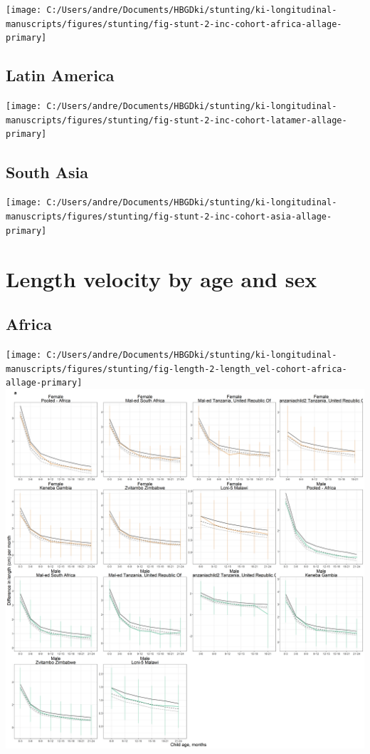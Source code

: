 \documentclass[
  9pt,
]{book}
\begin{document}
\texttt{[image: C:/Users/andre/Documents/HBGDki/stunting/ki-longitudinal-manuscripts/figures/stunting/fig-stunt-2-inc-cohort-africa-allage-primary]}

\hypertarget{latin-america-2}{%
\subsection{Latin America}\label{latin-america-2}}

\texttt{[image: C:/Users/andre/Documents/HBGDki/stunting/ki-longitudinal-manuscripts/figures/stunting/fig-stunt-2-inc-cohort-latamer-allage-primary]}

\hypertarget{south-asia-2}{%
\subsection{South Asia}\label{south-asia-2}}

\texttt{[image: C:/Users/andre/Documents/HBGDki/stunting/ki-longitudinal-manuscripts/figures/stunting/fig-stunt-2-inc-cohort-asia-allage-primary]}

\hypertarget{length-velocity-by-age-and-sex}{%
\section{Length velocity by age and sex}\label{length-velocity-by-age-and-sex}}

\hypertarget{africa-3}{%
\subsection{Africa}\label{africa-3}}

\texttt{[image: C:/Users/andre/Documents/HBGDki/stunting/ki-longitudinal-manuscripts/figures/stunting/fig-length-2-length\_vel-cohort-africa-allage-primary]}
\includegraphics[width=75in]{figure-copies/fig-length-2-length_vel-cohort-africa-allage-primary}
\end{document}
